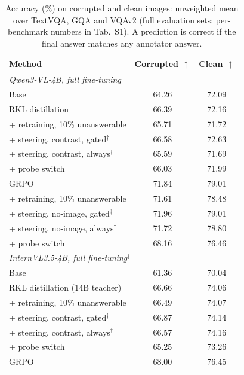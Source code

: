 \documentclass[10pt,twocolumn,letterpaper]{article}
\begin{document}
\begin{table}[t]
\centering
\caption{Accuracy (\%) on corrupted and clean images: unweighted mean over TextVQA, GQA and VQAv2
(full evaluation sets; per-benchmark numbers in Tab.~S1). A prediction is correct if the final answer
matches any annotator answer.}
\label{tab:accuracy}
\small
\setlength{\tabcolsep}{4pt}
\begin{tabular}{lcc}
\toprule
Method & Corrupted $\uparrow$ & Clean $\uparrow$ \\
\midrule
\multicolumn{3}{l}{\textit{Qwen3-VL-4B, full fine-tuning}} \\
Base                                         & 64.26 & 72.09 \\
RKL distillation                             & 66.39 & 72.16 \\
\quad + retraining, 10\% unanswerable        & 65.71 & 71.72 \\
\quad + steering, contrast, gated$^\dagger$  & 66.58 & 72.63 \\
\quad + steering, contrast, always$^\dagger$ & 65.59 & 71.69 \\
\quad + probe switch$^\dagger$               & 66.03 & 71.99 \\
GRPO                                         & 71.84 & 79.01 \\
\quad + retraining, 10\% unanswerable        & 71.61 & 78.48 \\
\quad + steering, no-image, gated$^\dagger$  & 71.96 & 79.01 \\
\quad + steering, no-image, always$^\dagger$ & 71.72 & 78.80 \\
\quad + probe switch$^\dagger$               & 68.16 & 76.46 \\
\midrule
\multicolumn{3}{l}{\textit{InternVL3.5-4B, full fine-tuning$^\ddagger$}} \\
Base                                         & 61.36 & 70.04 \\
RKL distillation (14B teacher)               & 66.66 & 74.06 \\
\quad + retraining, 10\% unanswerable        & 66.49 & 74.07 \\
\quad + steering, contrast, gated$^\dagger$  & 66.87 & 74.14 \\
\quad + steering, contrast, always$^\dagger$ & 66.57 & 74.16 \\
\quad + probe switch$^\dagger$               & 65.25 & 73.26 \\
GRPO                                         & 68.00 & 76.45 \\

\end{tabular}
\end{table}
\end{document}
